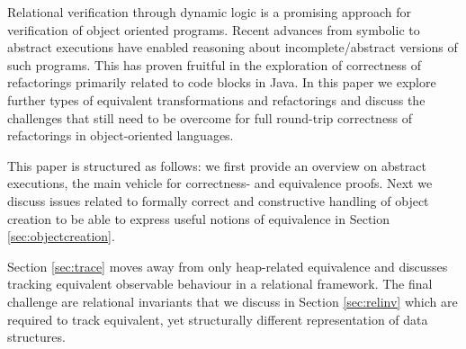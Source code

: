 
Relational verification through dynamic logic is a promising approach for verification of object oriented programs.
Recent advances from symbolic to abstract executions have enabled reasoning about incomplete/abstract versions of such programs.
This has proven fruitful in the exploration of correctness of refactorings primarily related to code blocks in Java.
In this paper we explore further types of equivalent transformations and refactorings and discuss the challenges that still need to be overcome for full round-trip correctness of refactorings in object-oriented languages.

This paper is structured as follows: we first provide an overview on abstract executions, the main vehicle for correctness- and equivalence proofs.
Next we discuss issues related to formally correct and constructive handling of object creation to be able to express useful notions of equivalence in Section \ref{sec:objectcreation}.

Section \ref{sec:trace} moves away from only heap-related equivalence and discusses tracking equivalent observable behaviour in a relational framework.
The final challenge are relational invariants that we discuss in Section \ref{sec:relinv} which are required to track equivalent, yet structurally different representation of data structures.

